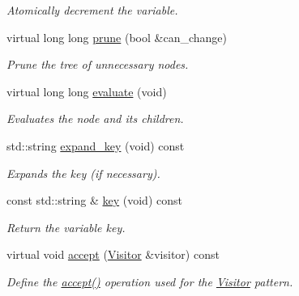 \begin{DoxyCompactItemize}
\begin{DoxyCompactList}\small\item\em Atomically decrement the variable. \item\end{DoxyCompactList}\item 
virtual long long \hyperlink{classMadara_1_1Expression__Tree_1_1Variable__Node_ae3cb5a153c295adf41642b1bf51062e1}{prune} (bool \&can\_\-change)
\begin{DoxyCompactList}\small\item\em Prune the tree of unnecessary nodes. \item\end{DoxyCompactList}\item 
virtual long long \hyperlink{classMadara_1_1Expression__Tree_1_1Variable__Node_a48e7fc9e0780338ba406bfca170276a6}{evaluate} (void)
\begin{DoxyCompactList}\small\item\em Evaluates the node and its children. \item\end{DoxyCompactList}\item 
std::string \hyperlink{classMadara_1_1Expression__Tree_1_1Variable__Node_aca575a92ff0b6ea976bc4aecde4d1440}{expand\_\-key} (void) const 
\begin{DoxyCompactList}\small\item\em Expands the key (if necessary). \item\end{DoxyCompactList}\item 
const std::string \& \hyperlink{classMadara_1_1Expression__Tree_1_1Variable__Node_a26ee74921419d18c2d2286856c48f62d}{key} (void) const 
\begin{DoxyCompactList}\small\item\em Return the variable key. \item\end{DoxyCompactList}\item 
virtual void \hyperlink{classMadara_1_1Expression__Tree_1_1Variable__Node_a86e843b4233c5fa145568d8dee2b6ad4}{accept} (\hyperlink{classMadara_1_1Expression__Tree_1_1Visitor}{Visitor} \&visitor) const 
\begin{DoxyCompactList}\small\item\em Define the {\itshape \hyperlink{classMadara_1_1Expression__Tree_1_1Variable__Node_a86e843b4233c5fa145568d8dee2b6ad4}{accept()}\/} operation used for the \hyperlink{classMadara_1_1Expression__Tree_1_1Visitor}{Visitor} pattern. \item\end{DoxyCompactList}\item 

\end{DoxyCompactItemize}
